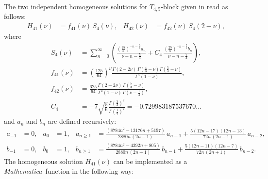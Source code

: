 \documentclass[sort&compress]{elsarticle}
\newcommand{\Mathematica}{\textit{Mathematica}}
\begin{document}
The two independent homogeneous solutions for $T_{4,5}$-block given in \cite{LeeMingulov:Meromorphic} read as follows:
\begin{equation}
	\label{eq:tadpole-homo}
	\begin{aligned}
		H_{41}(\nu) &= f_{41}(\nu) \, S_4(\nu), &
		H_{42}(\nu) &= f_{42}(\nu) \, S_4(2-\nu),
	\end{aligned}
\end{equation}
where
\begin{equation}
	\label{eq:tadpole-f}
	\begin{aligned}
		S_4(\nu) &= \sum_{n=0}^\infty \left(\frac{\left(\frac{25}{8}\right)^{-n-\frac{5}{4}} a_n}{\nu -n-\frac{5}{4}}+C_4\,\frac{\left(\frac{25}{8}\right)^{-n-\frac{7}{4}} b_n}{\nu -n-\frac{7}{4}}\right),
		\\
		f_{41}(\nu) &= \left(\frac{125}{64}\right)^\nu \frac{ \Gamma(2-2\nu) \, \Gamma\left(\frac{4}{3}-\nu\right) \Gamma\left(\frac{5}{3}-\nu\right) }{ \Gamma^4(1-\nu) },
		\\
		f_{42}(\nu) &= \frac{625}{64} \frac{ \Gamma(2-2\nu) \, \Gamma\left(\frac{7}{4}-\nu\right)}{\Gamma^4(1-\nu) \, \Gamma\left(\nu-\frac{1}{4}\right)},
		\\
		C_4 &= -7 \sqrt{\frac{5}{6}} \frac{\Gamma \left(\frac{3}{4}\right)^2}{\Gamma \left(\frac{1}{4}\right)^2} = -0.729983187537670\ldots
	\end{aligned}
\end{equation}
and $a_n$ and $b_n$ are defined recursively:
\begin{equation}
	\label{eq:tadpole-recur}
	\begin{aligned}
		a_{-1} &= 0, & a_0 &= 1, & 
		a_{n\geq 1} &= \frac{\left(8784 n^2-13176 n+5197\right)}{2880 n \, (2 n-1)} \, a_{n-1} +
			\frac{5 (12 n-17) (12 n-13)}{72 n \, (2 n-1)} \, a_{n-2},
		\\
		b_{-1} &= 0, & b_0 &= 1, & 
		b_{n\geq 1}&=\frac{\left(8784 n^2-4392 n+805\right)}{2880 n \, (2 n+1)} \, b_{n-1} +
			\frac{5 (12 n-11) (12 n-7)}{72 n \, (2 n+1)} \, b_{n-2}.
	\end{aligned}
\end{equation}
The homogeneous solution $H_{41}(\nu)$ can be implemented as a \Mathematica\ function in the following way:
\newcommand{\pbl}{\(\pmb{\big[}\)}
\newcommand{\pbr}{\(\pmb{\big]}\)}
\newcommand{\ppl}{\(\pmb{\big(}\)}
\newcommand{\ppr}{\(\pmb{\big)}\)}
\end{document}
